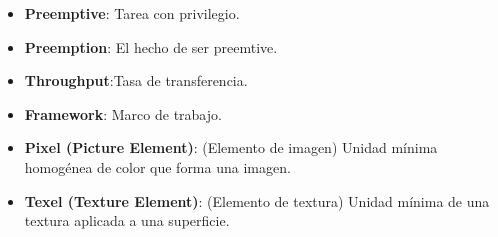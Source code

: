 \begin{itemize}
\item \textbf{Preemptive}: Tarea con privilegio.
\item \textbf{Preemption}: El hecho de ser preemtive.
\item \textbf{Throughput}:Tasa de transferencia.
\item \textbf{Framework}: Marco de trabajo.
\item \textbf{Pixel (Picture Element)}: (Elemento de imagen) Unidad mínima homogénea de color que forma una imagen.
\item \textbf{Texel (Texture Element)}: (Elemento de textura)  Unidad mínima de una textura aplicada a una superficie.
\end{itemize}  